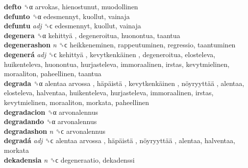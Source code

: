 \textbf{defto} ␝α  arvokas, hienostunut, muodollinen  \\
\textbf{defunto} ␝α  edesmennyt, kuollut, vainaja  \\
\textbf{defuntu} \emph{adj}  ␝ϲ  edesmennyt, kuollut, vainaja  \\
\textbf{degenera} ␝α   kehittyä , degeneroitua, huonontua, taantua  \\
\textbf{degenerashon} \emph{n}  ␝ϲ  heikkeneminen, rappeutuminen, regressio, taantuminen  \\
\textbf{degenerá} \emph{adj}  ␝ϲ   kehittyä ,  kevytkenkäinen , degeneroitua, elosteleva, huikenteleva, huonontua, hurjasteleva, immoraalinen, irstas, kevytmielinen, moraaliton, paheellinen, taantua  \\
\textbf{degrada} ␝α   alentaa arvossa ,  häpäistä ,  kevytkenkäinen ,  nöyryyttää , alentaa, elosteleva, halventaa, huikenteleva, hurjasteleva, immoraalinen, irstas, kevytmielinen, moraaliton, morkata, paheellinen  \\
\textbf{degradacion} ␝α  arvonalennus  \\
\textbf{degradando} ␝α  arvonalennus  \\
\textbf{degradashon} \emph{n}  ␝ϲ  arvonalennus  \\
\textbf{degradá} \emph{adj}  ␝ϲ   alentaa arvossa ,  häpäistä ,  nöyryyttää , alentaa, halventaa, morkata  \\
\textbf{dekadensia} \emph{n}  ␝ϲ  degeneraatio, dekadenssi  \\
